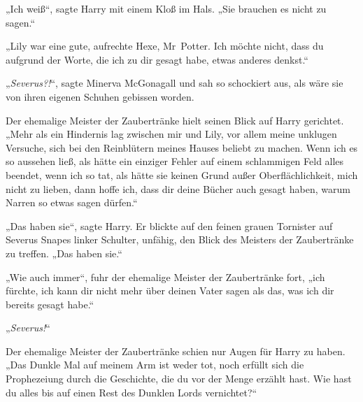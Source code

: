 „Ich weiß“, sagte Harry mit einem Kloß im Hals.
„Sie brauchen es nicht zu sagen.“

„Lily war eine gute, aufrechte Hexe, Mr~Potter. Ich möchte nicht, dass du aufgrund der Worte, die ich zu dir gesagt habe, etwas anderes denkst.“

„\emph{Severus?!}“, sagte Minerva McGonagall und sah so schockiert aus, als wäre sie von ihren eigenen Schuhen gebissen worden.

Der ehemalige Meister der Zaubertränke hielt seinen Blick auf Harry gerichtet.
„Mehr als ein Hindernis lag zwischen mir und Lily, vor allem meine unklugen Versuche, sich bei den Reinblütern meines Hauses beliebt zu machen. Wenn ich es so aussehen ließ, als hätte ein einziger Fehler auf einem schlammigen Feld alles beendet, wenn ich so tat, als hätte sie keinen Grund außer Oberflächlichkeit, mich nicht zu lieben, dann hoffe ich, dass dir deine Bücher auch gesagt haben, warum Narren so etwas sagen dürfen.“

„Das haben sie“, sagte Harry. Er blickte auf den feinen grauen Tornister auf Severus Snapes linker Schulter, unfähig, den Blick des Meisters der Zaubertränke zu treffen.
„Das haben sie.“

„Wie auch immer“, fuhr der ehemalige Meister der Zaubertränke fort, „ich fürchte, ich kann dir nicht mehr über deinen Vater sagen als das, was ich dir bereits gesagt habe.“

„\emph{Severus!}“

Der ehemalige Meister der Zaubertränke schien nur Augen für Harry zu haben.
„Das Dunkle Mal auf meinem Arm ist weder tot, noch erfüllt sich die Prophezeiung durch die Geschichte, die du vor der Menge erzählt hast. Wie hast du alles bis auf einen Rest des Dunklen Lords vernichtet?“

